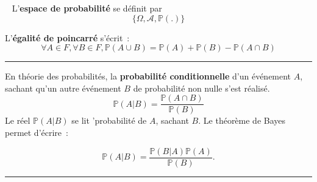 \begin{f}[Axiomatique]{\ }
	L'\textbf{espace de probabilité} se définit par 
	\[ \lbrace \Omega, \mathcal{A}, \mathbb{P}(.) \rbrace \]
	
	L'\textbf{égalité de poincarré} s'écrit~:
	$$\forall A \in F, \forall B \in F, \mathbb{P} (A \cup B) = \mathbb{P} (A) + \mathbb{P} (B) - \mathbb{P} (A \cap B)$$
	
\end{f}
\hrule

\begin{f}[Bayes]
	En théorie des probabilités, la \textbf{probabilité conditionnelle} d'un événement $A$, sachant qu'un autre événement $B$ de probabilité non nulle s'est réalisé.
	$$
	\mathbb{P}(A|B) = \frac{\mathbb{P}(A \cap B)}{\mathbb{P}(B)}
	$$
	Le réel $\mathbb{P}(A|B)$ se lit 'probabilité de $A$, sachant $B$.
	Le théorème de Bayes permet d'écrire~:
	
	$$   \mathbb{P}(A|B) = \frac{\mathbb{P}(B|A)\mathbb{P}(A)}{\mathbb{P}(B)}. $$
\end{f}
\hrule

